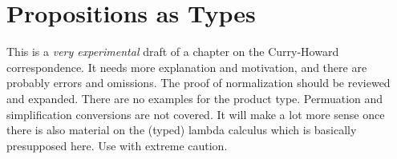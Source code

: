 \documentclass[../../../include/open-logic-chapter]{subfiles}
\begin{document}
\chapter{Propositions as Types}

\begin{editorial}
  This is a \emph{very experimental} draft of a chapter on the
  Curry-Howard correspondence.  It needs more explanation and
  motivation, and there are probably errors and omissions. The proof
  of normalization should be reviewed and expanded. There are no
  examples for the product type. Permuation and simplification
  conversions are not covered. It will make a lot more sense once
  there is also material on the (typed) lambda calculus which is
  basically presupposed here. Use with extreme caution.
\end{editorial}


\OLEndChapterHook
\end{document}
